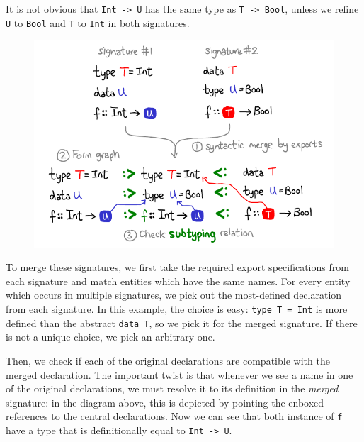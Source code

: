 \noindent
It is not obvious that \verb|Int -> U| has the same type as \verb|T -> Bool|,
unless we refine \verb|U| to \verb|Bool| and \verb|T| to \verb|Int| in
both signatures.

\begin{figure}[H]
\center\includegraphics{figures/signature-merging.pdf}
\end{figure}

\noindent
To merge these signatures,
we first take the required export specifications from each signature and
match entities which have the same names.
For every entity which occurs in multiple signatures,
we pick out the most-defined
declaration from each signature.  In this example, the choice is easy:
\verb|type T = Int| is more defined than the abstract \verb|data T|,
so we pick it for the merged signature.
If there is not a unique choice, we pick an arbitrary one.

Then, we check if each of the original declarations are compatible with
the merged declaration.  The important twist is that whenever we
see a name in one of the original declarations, we must resolve it
to its definition in the \emph{merged} signature: in the diagram above,
this is depicted by pointing the enboxed references to the central
declarations.  Now we can see that both instance of \verb|f| have a type that
is definitionally equal to \verb|Int -> U|.

